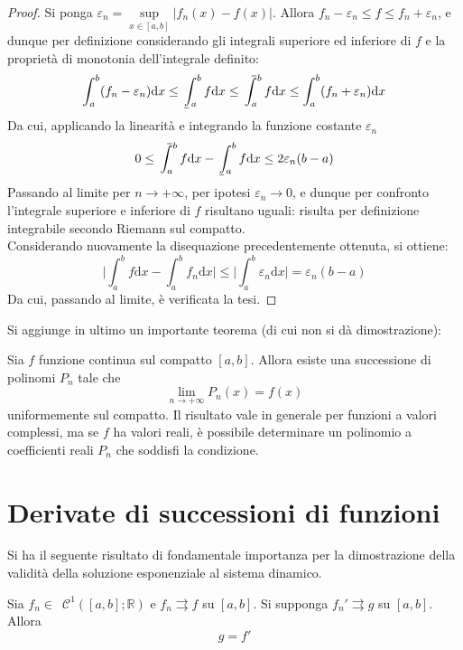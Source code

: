 \documentclass[10pt, oneside]{book}
\theoremstyle{plain}
\def\upint{\mathchoice%
    {\mkern13mu\overline{\vphantom{\intop}\mkern7mu}\mkern-20mu}%
    {\mkern7mu\overline{\vphantom{\intop}\mkern7mu}\mkern-14mu}%
    {\mkern7mu\overline{\vphantom{\intop}\mkern7mu}\mkern-14mu}%
    {\mkern7mu\overline{\vphantom{\intop}\mkern7mu}\mkern-14mu}%
  \int}
\def\lowint{\mkern3mu\underline{\vphantom{\intop}\mkern7mu}\mkern-10mu\int}
\begin{document}
\begin{proof}
Si ponga $\displaystyle \varepsilon_n = \sup\limits_{x \in [a,b]} |f_n(x) - f(x)|$. Allora $\displaystyle f_n - \varepsilon_n \leq f \leq f_n + \varepsilon_n$, e dunque per definizione considerando gli integrali superiore ed inferiore di $f$ e la proprietà di monotonia dell'integrale definito:
\[\int_{a}^{b}(f_n - \varepsilon_n)\textrm{d}x \leq \lowint_{a}^{b} f \textrm{d}x \leq \upint_{a}^{b}f\textrm{d}x \leq \int_{a}^{b}(f_n + \varepsilon_n)\textrm{d}x \]
Da cui, applicando la linearità e integrando la funzione costante $\varepsilon_n$
\[0 \leq \upint_{a}^{b}f\textrm{d}x - \lowint_{a}^{b}f\textrm{d}x \leq 2\varepsilon_n (b - a)\]
Passando al limite per $n \rightarrow +\infty$, per ipotesi $\varepsilon_n \rightarrow 0$, e dunque per confronto l'integrale superiore e inferiore di $f$ risultano uguali: risulta per definizione integrabile secondo Riemann sul compatto. 
\\Considerando nuovamente la disequazione precedentemente ottenuta, si ottiene:
\[\bigg|\int_{a}^{b}f\textrm{d}x - \int_{a}^{b}f_n\textrm{d}x\bigg| \leq \bigg|\int_{a}^{b}\varepsilon_n\textrm{d}x\bigg| = \varepsilon_n (b-a)\]
Da cui, passando al limite, è verificata la tesi. 
\end{proof}

Si aggiunge in ultimo un importante teorema (di cui non si dà dimostrazione):
\begin{ther}
Sia $f$ funzione continua sul compatto $[a,b]$. Allora esiste una successione di polinomi $P_n$ tale che
\[\lim\limits_{n \rightarrow +\infty} P_n(x) = f(x)\]
uniformemente sul compatto. Il risultato vale in generale per funzioni a valori complessi, ma se $f$ ha valori reali, è possibile determinare un polinomio a coefficienti reali $P_n$ che soddisfi la condizione.
\end{ther}

\section{Derivate di successioni di funzioni}
Si ha il seguente risultato di fondamentale importanza per la dimostrazione della validità della soluzione esponenziale al sistema dinamico.
\begin{ther}
Sia $f_n \in \enspace \mathcal{C}^{1}([a,b] ; \mathbb{R})$ e $f_n \rightrightarrows f$ su $[a,b]$. Si supponga $f_n' \rightrightarrows g$ su $[a,b]$. Allora
\[g = f'\]
\end{ther}
\end{document}
